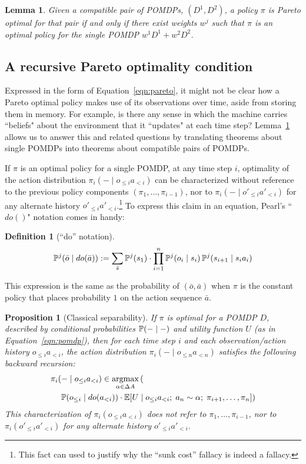 \documentclass{article}  %
\newcommand{\seq}{\bar}
\newcommand{\hist}[1]{o_{\le #1}a_{<#1}}
\newcommand{\althist}[1]{o'_{\le #1}a'_{<#1}}
\newcommand{\dohist}[1]{o_{\le #1} \mid do(a_{<#1})}
\newcommand{\eqn}[1]{Equation~\ref{eqn:#1}}
\newcommand{\lem}[1]{Lemma~\ref{lem:#1}}
\DeclareMathOperator*{\argmax}{argmax}
\newtheorem{proposition}[theorem]{Proposition}
\newtheorem{lemma}[theorem]{Lemma}
\newtheorem{definition}[theorem]{Definition}
\begin{document}
\begin{lemma}\label{lem:mixture}
Given a compatible pair of POMDPs, $(D^1,D^2)$, a policy $\pi$ is Pareto optimal for that pair if and only if there exist weights $w^j$ such that $\pi$ is an optimal policy for the single POMDP $w^1D^1+w^2D^2$.  
\end{lemma}

\subsection{A recursive Pareto optimality condition}

Expressed in the form of \eqn{pareto}, it might not be clear how a Pareto optimal policy makes use of its observations over time, aside from storing them in memory.  For example, is there any sense in which the machine carries ``beliefs" about the environment that it ``updates" at each time step?  \lem{mixture} allows us to answer this and related questions by translating theorems about single POMDPs into theorems about compatible pairs of POMDPs.  

If $\pi$ is an optimal policy for a single POMDP, at any time step $i$, optimality of the action distribution $\pi_i(-\mid\hist{i})$ can be characterized without reference to the previous policy components 
$(\pi_1,\ldots,\pi_{i-1})$, nor to $\pi_i(-\mid\althist{i})$ for any alternate history $\althist{i}$.\footnote{This fact can used to justify why the ``sunk cost'' fallacy is indeed a fallacy.}   To express this claim in an equation, Pearl's ``$do()$" notation \cite{Pe09} comes in handy:
\begin{definition}[``do'' notation]
\[
\PP^j(\seq o \mid do(\seq a)) := \sum_{\seq s} \PP^j(s_1) \cdot \prod_{i=1}^n
\PP^j(o_i \mid s_i)\, \PP^j(s_{i+1} \mid s_ia_i)
\]
\end{definition}

This expression is the same as the probability of $(\seq o, \seq a)$ when $\pi$ is the constant policy that places probability $1$ on the action sequence $\seq a$.

\begin{proposition}[Classical separability]\label{prop:separability}
If $\pi$ is optimal for a POMDP $D$, described by conditional probabilities $\mathbb{P}(-\mid -)$ and utility function $U$ (as in \eqn{pomdp}), then for each time step $i$ and each observation/action history $\hist{i}$, the action distribution $\pi_i(-\mid \hist{n})$ satisfies the following backward recursion:
\begin{align*}
& \pi_i(-\mid\hist{i}) \in \argmax_{\alpha\in\Delta A} \left(\vphantom{\left(()\right)}\right.\\
& \left.\quad \PP(\dohist{i})\cdot \EE[U \mid \hist{i} ;\; a_n\sim \alpha; \; \pi_{i+1},\ldots,\pi_{n}]\right)
\end{align*}
This characterization of $\pi_i(\hist{i})$ does not refer to $\pi_1,\ldots,\pi_{i-1}$, nor to 
$\pi_i(\althist{i})$ for any alternate history $\althist{i}$.
\end{proposition}
\end{document}
